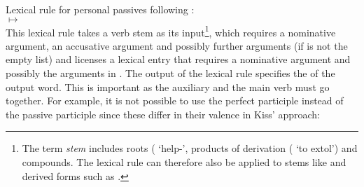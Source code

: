 \ea
\label{pass-lr-mlr}
Lexical rule for personal passives following \citet{Kiss92}:\\
 $\mapsto$ \\
\z
This lexical rule takes a verb stem as its input\footnote{
	The term \emph{stem} includes roots ( `help-', products of derivation
        ( `to extol') and compounds. The lexical rule can therefore also be applied to
        stems like  and derived forms such as .%
}, which requires a nominative argument, an accusative argument and possibly further arguments (if  is not the empty
list) and licenses a lexical entry that requires a nominative argument and possibly the arguments in . The output
of the lexical rule specifies the \vformv of the output word. This is important as the auxiliary and
the main verb must go together. For example, it is not possible to use the perfect participle instead of the passive participle since these differ
in their valence in Kiss' approach:
\eal
{}
\zl

